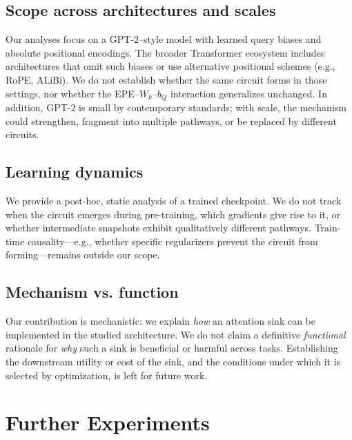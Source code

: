 \documentclass[11pt]{article}
\begin{document}
\subsection{Scope across architectures and scales}
Our analyses focus on a GPT-2–style model with learned query biases and absolute positional encodings. The broader Transformer ecosystem includes architectures that omit such biases or use alternative positional schemes (e.g., RoPE, ALiBi). We do not establish whether the same circuit forms in those settings, nor whether the EPE–$W_k$–$b_Q$ interaction generalizes unchanged. In addition, GPT-2 is small by contemporary standards; with scale, the mechanism could strengthen, fragment into multiple pathways, or be replaced by different circuits.

\subsection{Learning dynamics}
We provide a post-hoc, static analysis of a trained checkpoint. We do not track when the circuit emerges during pre-training, which gradients give rise to it, or whether intermediate snapshots exhibit qualitatively different pathways. Train-time causality—e.g., whether specific regularizers prevent the circuit from forming—remains outside our scope.

\subsection{Mechanism vs. function}
Our contribution is mechanistic: we explain \emph{how} an attention sink can be implemented in the studied architecture. We do not claim a definitive \emph{functional} rationale for \emph{why} such a sink is beneficial or harmful across tasks. Establishing the downstream utility or cost of the sink, and the conditions under which it is selected by optimization, is left for future work.




\appendix

\section{Further Experiments}
\end{document}

